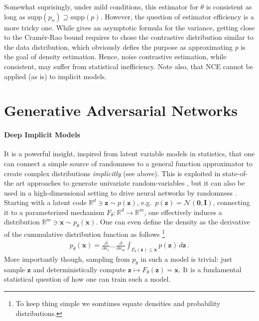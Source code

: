 \documentclass{article}
\renewcommand{\Re}{{\mathbb R}}
\newcommand{\x}{{\mathbf x}}
\newcommand{\z}{{\mathbf z}}
\begin{document}
Somewhat suprisingly, under mild conditions,  this estimator for $\theta$ is consistent \cite[Theorem 2]{gutmann2012noise} as long as $\text{supp}(p_n) \supseteq \text{supp}(p)$. However, the question of estimator efficiency is a more tricky one. While \cite[Theorem 3]{gutmann2012noise} gives an asymptotic formula for the variance, getting close to the Cram\'er-Rao bound requires to chose the contrastive distribution similar to the data distribution, which obviously defies the purpose as approximating $p$ is the goal of density estimation. Hence, noise contrastive estimation, while consistent, may suffer from statistical inefficiency. Note also, that NCE cannot be applied (as is) to implicit models. 

\section{Generative Adversarial Networks}


\paragraph{Deep Implicit Models} It is a powerful insight, inspired from latent variable models in statistics, that one can connect a simple source of randomness to a general function approximator to create complex distributions \textit{implicitly} (see above). This is exploited in state-of-the art approaches to generate univariate random-variables \cite{devroye1986sample}, but it can also be used in a high-dimensional setting to drive neural networks by randomness \cite{mackay1995bayesian}. Starting with a latent code $\Re^d \ni \z \sim p(\z)$, e.g.~$p(\z) = \mathcal N(\mathbf 0, \mathbf I)$, connecting it to a parameterized mechanism $F_\theta: \Re^d \to \Re^m$, one effectively induces a distribution $\Re^m \ni \x \sim p_\theta(\x)$. One can even define the density as the derivative of the cummulative distribution function as follows  \cite{mohamed2016learning}\footnote{To keep thing simple we somtimes equate densities and probability distributions.}
\begin{align}
p_\theta(\x) = \frac{\partial}{\partial x_1}  \dots \frac{\partial}{\partial x_m}  \int_{F_\theta(\z) \le \x} p(\z) \, d\z\,.
\end{align}
More importantly though, sampling from $p_\theta$ in such a model is trivial: just sample $\z$ and deterministically compute $\z \mapsto F_\theta(\z)=\x$. It is a fundamental statistical question of how one can train such a model.
\end{document}
